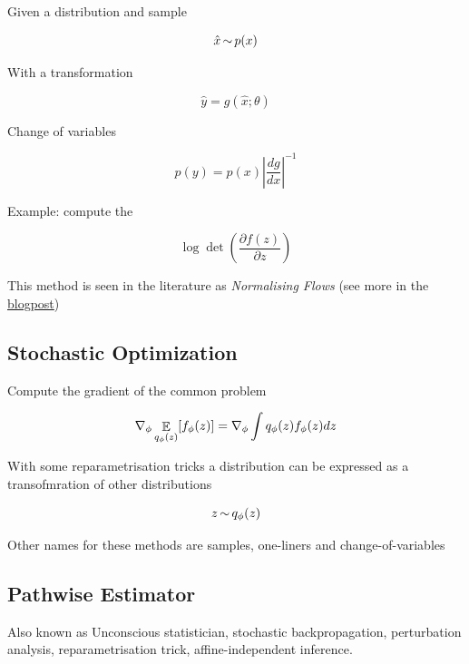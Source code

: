 \documentclass[b5paper]{report}
\begin{document}
Given a distribution and sample


\begin{equation}
  \hat{x} \operatorname*{\sim} p(x)
\end{equation}

With a transformation

\begin{equation}
  \hat{y} = g(\hat{x};\theta)
\end{equation}

Change of variables

\begin{equation}
  p(y) = p(x) \left| \frac{dg}{dx}\right|^{-1}
\end{equation}

Example: compute the

\begin{equation}
  \log \det \left( \frac{\partial f(z)}{\partial z}\right)
\end{equation}

This method is seen in the literature as \emph{Normalising Flows} (see more in
the \href{http://akosiorek.github.io/ml/2018/04/03/norm_flows.html}{blogpost})

\subsection{Stochastic Optimization}

Compute the gradient of the common problem

\begin{equation}
  \nabla_\phi \operatorname*{\mathbb{\mathop{E}}}_{q_\phi(z)} [f_\phi (z)] = \nabla_\phi \int q_\phi (z) f_\phi(z) dz
\end{equation}

With some reparametrisation tricks a distribution can be expressed as a
transofmration of other distributions

\begin{equation}
  z \operatorname*{\sim} q_\phi(z)
\end{equation}

Other names for these methods are samples, one-liners and change-of-variables

\subsection{Pathwise Estimator}

Also known as Unconscious statistician, stochastic backpropagation,
perturbation analysis, reparametrisation trick, affine-independent inference.
\end{document}
